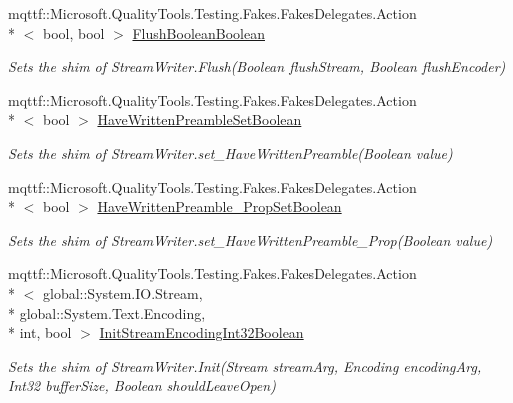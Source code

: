 \begin{DoxyCompactItemize}
mqttf\-::\-Microsoft.\-Quality\-Tools.\-Testing.\-Fakes.\-Fakes\-Delegates.\-Action\\*
$<$ bool, bool $>$ \hyperlink{class_system_1_1_i_o_1_1_fakes_1_1_shim_stream_writer_a701dd87c17a96515d464ff52878998d6}{Flush\-Boolean\-Boolean}
\begin{DoxyCompactList}\small\item\em Sets the shim of Stream\-Writer.\-Flush(\-Boolean flush\-Stream, Boolean flush\-Encoder)\end{DoxyCompactList}\item 
mqttf\-::\-Microsoft.\-Quality\-Tools.\-Testing.\-Fakes.\-Fakes\-Delegates.\-Action\\*
$<$ bool $>$ \hyperlink{class_system_1_1_i_o_1_1_fakes_1_1_shim_stream_writer_ae1fa246a65e8f996d8cdc6f73830d65f}{Have\-Written\-Preamble\-Set\-Boolean}
\begin{DoxyCompactList}\small\item\em Sets the shim of Stream\-Writer.\-set\-\_\-\-Have\-Written\-Preamble(\-Boolean value)\end{DoxyCompactList}\item 
mqttf\-::\-Microsoft.\-Quality\-Tools.\-Testing.\-Fakes.\-Fakes\-Delegates.\-Action\\*
$<$ bool $>$ \hyperlink{class_system_1_1_i_o_1_1_fakes_1_1_shim_stream_writer_a256097e00619b97af41149bf583879f4}{Have\-Written\-Preamble\-\_\-\-Prop\-Set\-Boolean}
\begin{DoxyCompactList}\small\item\em Sets the shim of Stream\-Writer.\-set\-\_\-\-Have\-Written\-Preamble\-\_\-\-Prop(\-Boolean value)\end{DoxyCompactList}\item 
mqttf\-::\-Microsoft.\-Quality\-Tools.\-Testing.\-Fakes.\-Fakes\-Delegates.\-Action\\*
$<$ global\-::\-System.\-I\-O.\-Stream, \\*
global\-::\-System.\-Text.\-Encoding, \\*
int, bool $>$ \hyperlink{class_system_1_1_i_o_1_1_fakes_1_1_shim_stream_writer_a782ffe2365cefcbcbb1ffc24f515e596}{Init\-Stream\-Encoding\-Int32\-Boolean}
\begin{DoxyCompactList}\small\item\em Sets the shim of Stream\-Writer.\-Init(\-Stream stream\-Arg, Encoding encoding\-Arg, Int32 buffer\-Size, Boolean should\-Leave\-Open)\end{DoxyCompactList}\item 

\end{DoxyCompactItemize}
